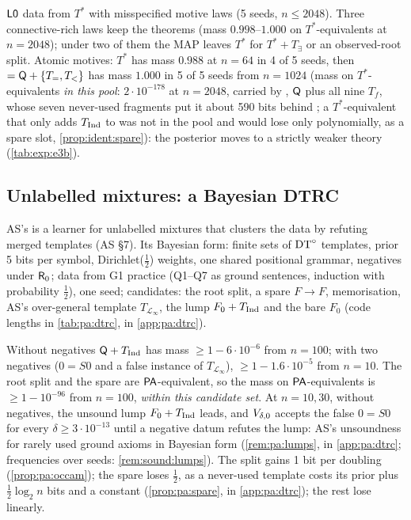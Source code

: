 \begin{remark}[E3(b)]\pabrk{}\label{rem:pa:e3b}
$\mathord{\mathsf{L0}}$ data from $T^*$ with misspecified motive laws (5 seeds, $n\le2048$). Three connective-rich laws keep the theorems (mass $0.998$--$1.000$ on $T^*$-equivalents at $n=2048$); under two of them the MAP leaves $T^*$ for $T^*+T_\exists$ or an observed-root split. Atomic motives: $T^*$ has mass $0.988$ at $n=64$ in 4 of 5 seeds, then  $=\mathsf{Q}+\{T_=,T_<\}$ has mass $1.000$ in 5 of 5 seeds from $n=1024$ (mass on $T^*$-equivalents \emph{in this pool}: $2\cdot10^{-178}$ at $n=2048$, carried by , $\mathsf{Q}$ plus all nine $T_f$, whose seven never-used fragments put it about 590 bits behind ; a $T^*$-equivalent that only adds $T_{\mathrm{Ind}}$ to  was not in the pool and would lose only polynomially, as a spare slot, \cref{prop:ident:spare}): the posterior moves to a strictly weaker theory (\cref{tab:exp:e3b}).
\end{remark}

\subsection{Unlabelled mixtures: a Bayesian DTRC}\label{sec:pa:dtrc}

AS's \DTRC{} is a learner for unlabelled mixtures that clusters the data by refuting merged templates (AS \S7). Its Bayesian form: finite sets of $\mathrm{DT}^{\circ}$ templates, prior 5 bits per symbol, Dirichlet($\frac12$) weights, one shared positional grammar, negatives under $\mathsf{R}_{0}$; data from G1 practice (Q1--Q7 as ground sentences, induction with probability $\frac12$), one seed; candidates: the root split, a spare $F\to F$, memorisation, AS's over-general template $T_{\mathcal L_\infty}$, the lump $F_0+T_{\mathrm{Ind}}$ and the bare $F_0$ (code lengths in \cref{tab:pa:dtrc}, in \cref{app:pa:dtrc}).


\noindent Without negatives $\mathsf{Q}+T_{\mathrm{Ind}}$ has mass $\ge1-6\cdot10^{-6}$ from $n=100$; with two negatives ($0=S0$ and a false instance of $T_{\mathcal L_\infty}$), $\ge1-1.6\cdot10^{-5}$ from $n=10$. The root split and the spare are $\mathsf{PA}$-equivalent, so the mass on $\mathsf{PA}$-equivalents is $\ge1-10^{-96}$ from $n=100$, \emph{within this candidate set}. At $n=10,30$, without negatives, the unsound lump $F_0+T_{\mathrm{Ind}}$ leads, and $V_{\delta,0}$ accepts the false $0=S0$ for every $\delta\ge3\cdot10^{-13}$ until a negative datum refutes the lump: AS's unsoundness for rarely used ground axioms in Bayesian form (\cref{rem:pa:lumps}, in \cref{app:pa:dtrc}; frequencies over seeds: \cref{rem:sound:lumps}). The split gains 1 bit per doubling (\cref{prop:pa:occam}); the spare loses $\frac12$, as a never-used template costs its prior plus $\frac12\log_2n$ bits and a constant (\cref{prop:pa:spare}, in \cref{app:pa:dtrc}); the rest lose linearly.


